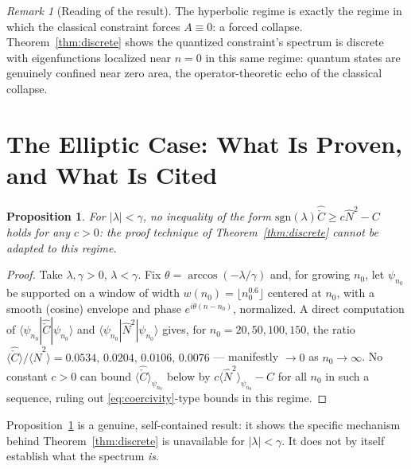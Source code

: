 \documentclass[11pt]{amsart}
\newtheorem{proposition}[theorem]{Proposition}
\theoremstyle{remark}
\newtheorem*{remark}{Remark}
\begin{document}
\begin{remark}[Reading of the result]
The hyperbolic regime is exactly the regime in which the classical constraint forces $A\equiv0$: a forced collapse. Theorem~\ref{thm:discrete} shows the quantized constraint's spectrum is discrete with eigenfunctions localized near $n=0$ in this same regime: quantum states are genuinely confined near zero area, the operator-theoretic echo of the classical collapse.
\end{remark}

\section{The Elliptic Case: What Is Proven, and What Is Cited}

\begin{proposition}\label{prop:no-coercivity}
For $|\lambda|<\gamma$, no inequality of the form $\mathrm{sgn}(\lambda)\hat{\check C}\geq c\hat N^2-C$ holds for any $c>0$: the proof technique of Theorem~\ref{thm:discrete} cannot be adapted to this regime.
\end{proposition}
\begin{proof}
Take $\lambda,\gamma>0$, $\lambda<\gamma$. Fix $\theta=\arccos(-\lambda/\gamma)$ and, for growing $n_0$, let $\psi_{n_0}$ be supported on a window of width $w(n_0)=\lfloor n_0^{0.6}\rfloor$ centered at $n_0$, with a smooth (cosine) envelope and phase $e^{i\theta(n-n_0)}$, normalized. A direct computation of $\langle\psi_{n_0}|\hat{\check C}|\psi_{n_0}\rangle$ and $\langle\psi_{n_0}|\hat N^2|\psi_{n_0}\rangle$ gives, for $n_0=20,50,100,150$, the ratio $\langle\hat{\check C}\rangle/\langle\hat N^2\rangle = 0.0534,\,0.0204,\,0.0106,\,0.0076$ --- manifestly $\to0$ as $n_0\to\infty$. No constant $c>0$ can bound $\langle\hat{\check C}\rangle_{\psi_{n_0}}$ below by $c\langle\hat N^2\rangle_{\psi_{n_0}}-C$ for all $n_0$ in such a sequence, ruling out \eqref{eq:coercivity}-type bounds in this regime.
\end{proof}

Proposition~\ref{prop:no-coercivity} is a genuine, self-contained result: it shows the specific mechanism behind Theorem~\ref{thm:discrete} is unavailable for $|\lambda|<\gamma$. It does not by itself establish what the spectrum \emph{is}.
\end{document}
